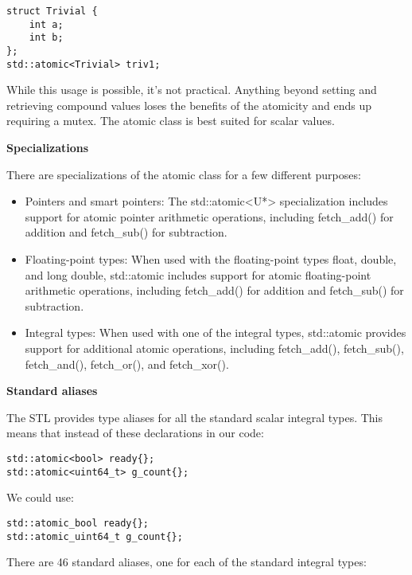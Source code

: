 \begin{lstlisting}[style=styleCXX]
struct Trivial {
	int a;
	int b;
};
std::atomic<Trivial> triv1;
\end{lstlisting}

While this usage is possible, it's not practical. Anything beyond setting and retrieving compound values loses the benefits of the atomicity and ends up requiring a mutex. The atomic class is best suited for scalar values.

\noindent
\textbf{Specializations}

There are specializations of the atomic class for a few different purposes:

\begin{itemize}
\item 
Pointers and smart pointers: The std::atomic<U*> specialization includes support for atomic pointer arithmetic operations, including fetch\_add() for addition and fetch\_sub() for subtraction.

\item 
Floating-point types: When used with the floating-point types float, double, and long double, std::atomic includes support for atomic floating-point arithmetic operations, including fetch\_add() for addition and fetch\_sub() for subtraction.

\item 
Integral types: When used with one of the integral types, std::atomic provides support for additional atomic operations, including fetch\_add(), fetch\_sub(), fetch\_and(), fetch\_or(), and fetch\_xor().

\end{itemize}


\noindent
\textbf{Standard aliases}

The STL provides type aliases for all the standard scalar integral types. This means that instead of these declarations in our code:

\begin{lstlisting}[style=styleCXX]
std::atomic<bool> ready{};
std::atomic<uint64_t> g_count{};
\end{lstlisting}

We could use:

\begin{lstlisting}[style=styleCXX]
std::atomic_bool ready{};
std::atomic_uint64_t g_count{};
\end{lstlisting}

There are 46 standard aliases, one for each of the standard integral types:

